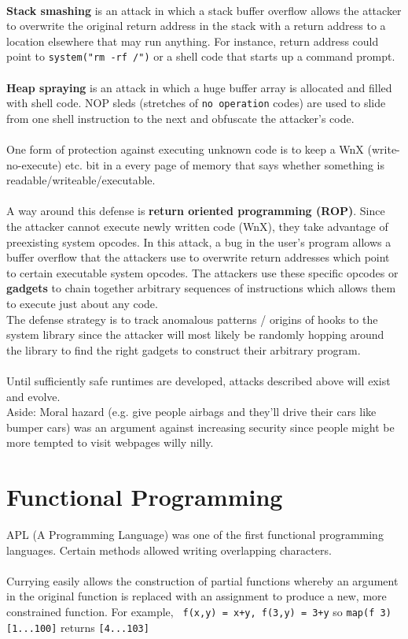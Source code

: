 \documentclass[twoside]{article}
\begin{document}
\\
\textbf{Stack smashing} is an attack in which a stack buffer overflow allows the attacker to overwrite the original return address in the stack with a return address to a location elsewhere that may run anything.  For instance, return address could point to \verb;system("rm -rf /"); or a shell code that starts up a command prompt.\\
\\
\textbf{Heap spraying} is an attack in which a huge buffer array is allocated and filled with shell code.  NOP sleds (stretches of \verb;no operation; codes) are used to slide from one shell instruction to the next and obfuscate the attacker's code.\\
\\
One form of protection against executing unknown code is to keep a WnX (write-no-execute) etc. bit in a every page of memory that says whether something is readable/writeable/executable.\\
\\
A way around this defense is \textbf{return oriented programming (ROP)}.  Since the attacker cannot execute newly written code (WnX), they take advantage of preexisting system opcodes.  In this attack, a bug in the user's program allows a buffer overflow that the attackers use to overwrite return addresses which point to certain executable system opcodes.  The attackers use these specific opcodes or \textbf{gadgets} to chain together arbitrary sequences of instructions which allows them to execute just about any code.\\
The defense strategy is to track anomalous patterns / origins of hooks to the system library since the attacker will most likely be randomly hopping around the library to find the right gadgets to construct their arbitrary program.\\
\\
Until sufficiently safe runtimes are developed, attacks described above will exist and evolve.
\\
Aside: Moral hazard (e.g. give people airbags and they'll drive their cars like bumper cars) was an argument against increasing security since people might be more tempted to visit webpages willy nilly.
%
%
\section{Functional Programming}
APL (A Programming Language) was one of the first functional programming languages.  Certain methods allowed writing overlapping characters.\\
\\
Currying easily allows the construction of partial functions whereby an argument in the original function is replaced with an assignment to produce a new, more constrained function.  For example, \verb; f(x,y) = x+y, f(3,y) = 3+y; so \verb;map(f 3) [1...100]; returns \verb;[4...103];
\end{document}
